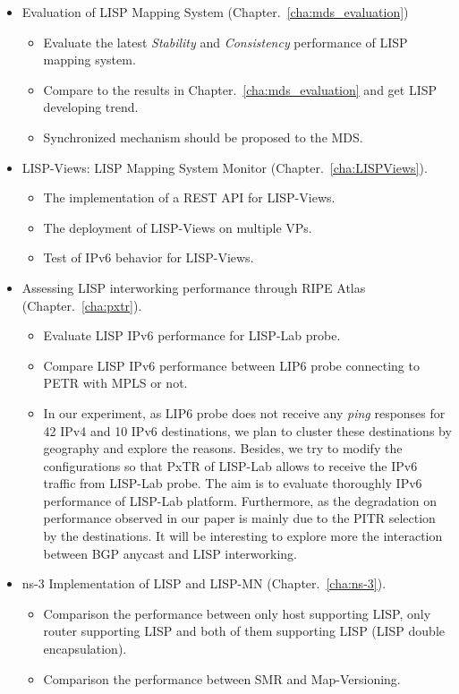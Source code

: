 \begin{itemize}[noitemsep,topsep=0pt]
    \item Evaluation of LISP Mapping System (Chapter.~\ref{cha:mds_evaluation})
    \begin{itemize}[noitemsep,topsep=0pt]
        \item Evaluate the latest \emph{Stability} and \emph{Consistency} performance of LISP mapping system. 
        \item Compare to the results in Chapter.~\ref{cha:mds_evaluation} and get LISP developing trend.
        \item Synchronized mechanism should be proposed to the MDS.
    \end{itemize}
    
    \item LISP-Views: LISP Mapping System Monitor (Chapter.~\ref{cha:LISPViews}).
    \begin{itemize}[noitemsep,topsep=0pt]
        \item The implementation of a REST API for LISP-Views.
        \item The deployment of LISP-Views on multiple VPs.
        \item Test of IPv6 behavior for LISP-Views.
    \end{itemize}
    
    \item Assessing LISP interworking performance through RIPE Atlas (Chapter.~\ref{cha:pxtr}).
    \begin{itemize}[noitemsep,topsep=0pt]
        \item Evaluate LISP IPv6 performance for LISP-Lab probe.
        \item Compare LISP IPv6 performance between LIP6 probe connecting to PETR with MPLS or not.
        \item In our experiment, as LIP6 probe does not receive any \emph{ping} responses for 42 IPv4 and 10 IPv6 destinations, we plan to cluster these destinations by geography and explore the reasons. Besides, we try to modify the configurations so that PxTR of LISP-Lab allows to receive the IPv6 traffic from LISP-Lab probe. The aim is to evaluate thoroughly IPv6 performance of LISP-Lab platform. Furthermore, as the degradation on performance observed in our paper is mainly due to the PITR selection by the destinations. It will be interesting to explore more the interaction between BGP anycast and LISP interworking. 
    \end{itemize}
    
    \item ns-3 Implementation of LISP and LISP-MN (Chapter.~\ref{cha:ns-3}).
    \begin{itemize}[noitemsep,topsep=0pt]
        \item Comparison the performance between only host supporting LISP, only router supporting LISP and both of them supporting LISP (LISP double encapsulation).
        \item Comparison the performance between SMR and Map-Versioning.
    \end{itemize}
\end{itemize}